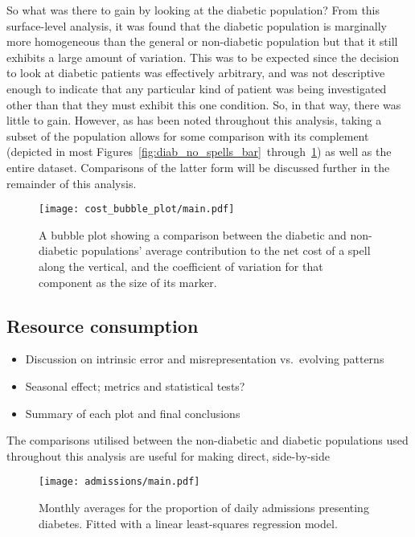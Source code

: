 So what was there to gain by looking at the diabetic population? From this
surface-level analysis, it was found that the diabetic population is marginally
more homogeneous than the general or non-diabetic population but that it still
exhibits a large amount of variation. This was to be expected since the decision
to look at diabetic patients was effectively arbitrary, and was not descriptive
enough to indicate that any particular kind of patient was being investigated
other than that they must exhibit this one condition. So, in that way, there was
little to gain. However, as has been noted throughout this analysis, taking a
subset of the population allows for some comparison with its complement
(depicted in most
Figures~\ref{fig:diab_no_spells_bar}~through~\ref{fig:diab_bubble_plot}) as well
as the entire dataset. Comparisons of the latter form will be discussed further
in the remainder of this analysis.

\begin{figure}[htbp]
    \centering
    \texttt{[image: cost\_bubble\_plot/main.pdf]}
    \caption{A bubble plot showing a comparison between the diabetic and
        non-diabetic populations' average contribution to the net cost of a
        spell along the vertical, and the coefficient of variation for that
        component as the size of its marker.}%
    \label{fig:diab_bubble_plot}
\end{figure}

\subsection{Resource consumption}\label{subsec:diab_resources}

\begin{itemize}
    \item Discussion on intrinsic error and misrepresentation vs.\ evolving
        patterns
    \item Seasonal effect; metrics and statistical tests?
    \item Summary of each plot and final conclusions
\end{itemize}

The comparisons utilised between the non-diabetic and diabetic populations used
throughout this analysis are useful for making direct, side-by-side 

\begin{figure}[htbp]
    \centering
    \texttt{[image: admissions/main.pdf]}
    \caption{Monthly averages for the proportion of daily admissions presenting
        diabetes. Fitted with a linear least-squares regression model.}%
    \label{fig:admissions}
\end{figure}

